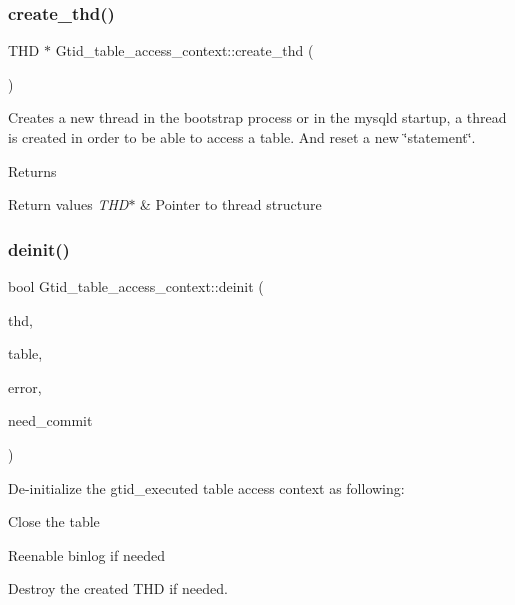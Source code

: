 \subsubsection{\texorpdfstring{create\+\_\+thd()}{create\_thd()}}
{\footnotesize\ttfamily T\+HD $\ast$ Gtid\+\_\+table\+\_\+access\+\_\+context\+::create\+\_\+thd (\begin{DoxyParamCaption}{ }\end{DoxyParamCaption})}

Creates a new thread in the bootstrap process or in the mysqld startup, a thread is created in order to be able to access a table. And reset a new \char`\"{}statement\char`\"{}.

\begin{DoxyReturn}{Returns}

\end{DoxyReturn}

\begin{DoxyRetVals}{Return values}
{\em T\+H\+D$\ast$} & Pointer to thread structure \\
\hline
\end{DoxyRetVals}
\mbox{\label{classGtid__table__access__context_a07f00187a61eaad20592022fb51bac02}} 
\subsubsection{\texorpdfstring{deinit()}{deinit()}}
{\footnotesize\ttfamily bool Gtid\+\_\+table\+\_\+access\+\_\+context\+::deinit (\begin{DoxyParamCaption}\item[{T\+HD $\ast$}]{thd,  }\item[{\mbox{\hyperlink{structTABLE}{T\+A\+B\+LE}} $\ast$}]{table,  }\item[{bool}]{error,  }\item[{bool}]{need\+\_\+commit }\end{DoxyParamCaption})}

De-\/initialize the gtid\+\_\+executed table access context as following\+:
\begin{DoxyItemize}
\item Close the table
\item Reenable binlog if needed
\item Destroy the created T\+HD if needed.
\end{DoxyItemize}


